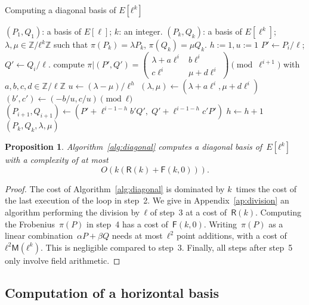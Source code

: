 \documentclass{lms}
\newtheorem{prop}[thm]{Proposition}
\begin{document}
\begin{algorithm}
\caption{\label{alg:diagonal}Computing a diagonal basis of $E[ℓ^k]$}
\begin{algorithmic}[1]
\REQUIRE $(P_1, Q_1 )$: a basis of $E[\ell]$;
$k$: an integer.
\ENSURE $(P_k, Q_k )$: a basis of $E[\ell^k]$;
$λ, μ ∈ ℤ/ℓ^k ℤ$
such that $\pi(P_k)= λ P_k$, $ \pi(Q_k)= μ Q_k$.
\STATE $h:=1, u:=1$
\STATE $P' \leftarrow P_i/\ell$; $Q' \leftarrow Q_i/\ell$.
\STATE compute $\pi|(P',Q')=\left( \begin{array}{cc}
λ + a\ell^{i} & b\ell^{i}\\
c\ell^{i} & μ + d\ell^{i}
\end{array} \right) \pmod {\ell^{i+1}}$
with $a,b,c,d \in \mathbb{Z}/\ell\mathbb{Z}$
\STATE $u \leftarrow (λ -μ)/\ell^h$
\ENDIF
\STATE $(λ, μ) \gets
  (λ + a\ell^i, μ + d\ell^i)$
\STATE $(b',c') \gets (-b/u , c/u) \pmod{ℓ}$
\STATE $(P_{i+1},Q_{i+1}) \gets
  (P'+\ell^{i-1-h}b' Q',\;Q'+\ell^{i-1-h}c' P')$
\STATE $h \leftarrow h+1$
\ENDIF
\ENDFOR
\RETURN $(P_{k},Q_{k},λ,μ)$
\end{algorithmic}
\end{algorithm}
\begin{prop}
Algorithm~\ref{alg:diagonal} computes a diagonal basis of~$E[ℓ^k]$
with a complexity of at most \vskip -20pt
\begin{equation*}
O(k(\mathsf{R}(k)+\mathsf{F}(k,0))).
\end{equation*}

\end{prop}
\begin{proof}
The cost of Algorithm~\ref{alg:diagonal} is dominated
by $k$~times the cost of the last execution of the loop in step~2.
We give in Appendix~\ref{ap:division} an algorithm
performing the division by~$ℓ$ of step~3 at a cost of~$\mathsf R(k)$.
Computing the Frobenius~$π(P)$ in step~4 has a cost of~$\mathsf{F}(k, 0)$.
Writing~$π(P)$ as a linear combination~$α P + β Q$
needs at most~$ℓ^2$ point additions, with a cost of~$ℓ^2 \mathsf{M}(ℓ^k)$.
This is %
negligible compared to step~3.
Finally, all steps after step~5 only involve field arithmetic.
\end{proof}

\subsection{Computation of a horizontal basis}
\label{ss:horizontal}
\end{document}
